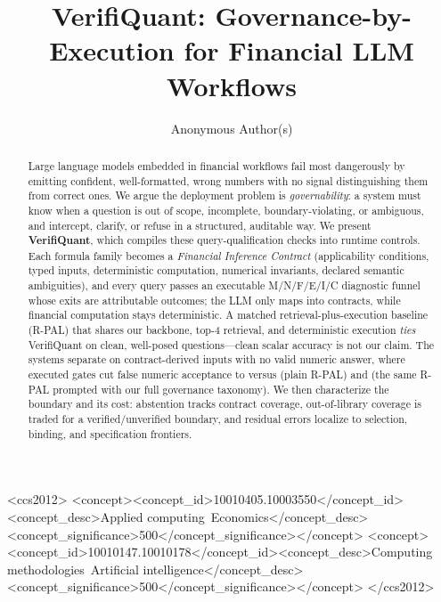 \title{VerifiQuant: Governance-by-Execution for Financial LLM Workflows}

\author{Anonymous Author(s)}

\begin{abstract}
Large language models embedded in financial workflows fail most dangerously by emitting confident, well-formatted, wrong numbers with no signal distinguishing them from correct ones.
We argue the deployment problem is \emph{governability}: a system must know when a question is out of scope, incomplete, boundary-violating, or ambiguous, and intercept, clarify, or refuse in a structured, auditable way.
We present \textbf{VerifiQuant}, which compiles these query-qualification checks into runtime controls.
Each formula family becomes a \emph{Financial Inference Contract} (applicability conditions, typed inputs, deterministic computation, numerical invariants, declared semantic ambiguities), and every query passes an executable M/N/F/E/I/C diagnostic funnel whose exits are attributable outcomes; the LLM only maps into contracts, while financial computation stays deterministic.
A matched retrieval-plus-execution baseline (R-PAL) that shares our backbone, top-4 retrieval, and deterministic execution \emph{ties} VerifiQuant on clean, well-posed questions---clean scalar accuracy is not our claim.
The systems separate on contract-derived inputs with no valid numeric answer, where executed gates cut false numeric acceptance to \govVQfnar{} versus \govPlainFnar{} (plain R-PAL) and \govPromptFnar{} (the same R-PAL prompted with our full governance taxonomy).
We then characterize the boundary and its cost: abstention tracks contract coverage, out-of-library coverage is traded for a verified/unverified boundary, and residual errors localize to selection, binding, and specification frontiers.
\end{abstract}

\begin{CCSXML}
<ccs2012>
<concept><concept_id>10010405.10003550</concept_id><concept_desc>Applied computing~Economics</concept_desc><concept_significance>500</concept_significance></concept>
<concept><concept_id>10010147.10010178</concept_id><concept_desc>Computing methodologies~Artificial intelligence</concept_desc><concept_significance>500</concept_significance></concept>
</ccs2012>
\end{CCSXML}

